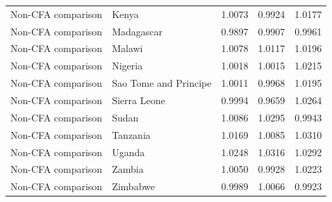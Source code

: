 \begin{table}
\begin{tabular}[t]{llrrr}
Non-CFA comparison & Kenya & 1.0073 & 0.9924 & 1.0177\\
\addlinespace
Non-CFA comparison & Madagascar & 0.9897 & 0.9907 & 0.9961\\
Non-CFA comparison & Malawi & 1.0078 & 1.0117 & 1.0196\\
Non-CFA comparison & Nigeria & 1.0018 & 1.0015 & 1.0215\\
Non-CFA comparison & Sao Tome and Principe & 1.0011 & 0.9968 & 1.0195\\
Non-CFA comparison & Sierra Leone & 0.9994 & 0.9659 & 1.0264\\
\addlinespace
Non-CFA comparison & Sudan & 1.0086 & 1.0295 & 0.9943\\
Non-CFA comparison & Tanzania & 1.0169 & 1.0085 & 1.0310\\
Non-CFA comparison & Uganda & 1.0248 & 1.0316 & 1.0292\\
Non-CFA comparison & Zambia & 1.0050 & 0.9928 & 1.0223\\
Non-CFA comparison & Zimbabwe & 0.9989 & 1.0066 & 0.9923\\
\bottomrule
\end{tabular}
\end{table}